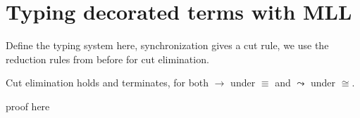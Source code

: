 
\section{Typing decorated terms with MLL}

\begin{definition}
Define the typing system here, synchronization gives a cut rule, we use the reduction rules from before for cut elimination.
\end{definition}

\begin{proposition}
Cut elimination holds and terminates, for both $\to$ under $\equiv$ and $\leadsto$ under $\cong$.
\end{proposition}

\begin{myproof}
proof here
\end{myproof}